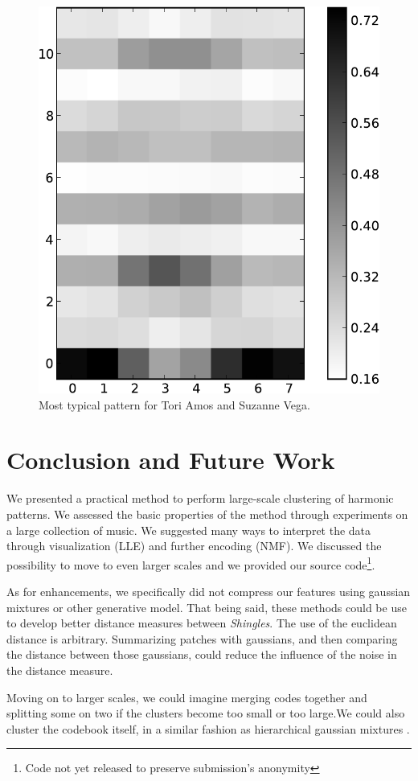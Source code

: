 \documentclass{article}
\begin{document}
\begin{figure}[htb]
\begin{center}
\includegraphics[width=.4\columnwidth]{toriamos_suzannevega_pattern}
\end{center}
\caption{\small{Most typical pattern for Tori Amos and Suzanne Vega.}}
\label{fig:amosvega}
\end{figure}



\section{Conclusion and Future Work}
We presented a practical method to perform large-scale clustering of
harmonic patterns. We assessed the basic properties of the method through
experiments on a large collection of music. We suggested many ways
to interpret the data through visualization (LLE) and further encoding
(NMF). We discussed the possibility to move to even larger scales
and we provided our source code\footnote{Code not yet released to preserve
submission's anonymity}.

As for enhancements, we specifically did not compress our features using
gaussian mixtures or other generative model. That being said, these methods
could be use to develop better distance measures between \textit{Shingles}.
The use of the euclidean distance is arbitrary. Summarizing patches
with gaussians, and then comparing the distance between those gaussians,
could reduce the influence of the noise in the distance measure.

Moving on to larger scales, we could imagine merging codes together and
splitting some on two if the clusters become too small or too large.We could
also cluster the codebook itself, in a similar fashion as hierarchical
gaussian mixtures \cite{Vasconcelos2001}.


\small



\end{document}
